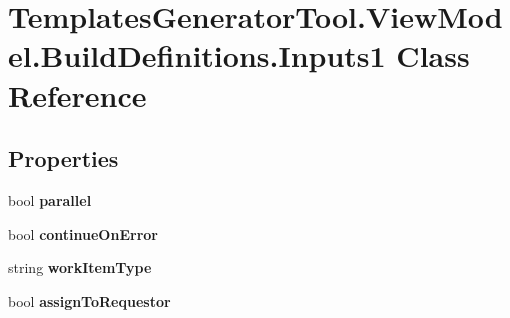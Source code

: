 \hypertarget{class_templates_generator_tool_1_1_view_model_1_1_build_definitions_1_1_inputs1}{}\section{Templates\+Generator\+Tool.\+View\+Model.\+Build\+Definitions.\+Inputs1 Class Reference}
\label{class_templates_generator_tool_1_1_view_model_1_1_build_definitions_1_1_inputs1}
\subsection*{Properties}
\begin{DoxyCompactItemize}
\item 
\mbox{\label{class_templates_generator_tool_1_1_view_model_1_1_build_definitions_1_1_inputs1_a7889a8105e52ce2127f5bbdc7e38c521}} 
bool {\bfseries parallel}
\item 
\mbox{\label{class_templates_generator_tool_1_1_view_model_1_1_build_definitions_1_1_inputs1_a112625b2b75f0912c9e38880867ef072}} 
bool {\bfseries continue\+On\+Error}
\item 
\mbox{\label{class_templates_generator_tool_1_1_view_model_1_1_build_definitions_1_1_inputs1_afe2dcf45837d9b8d3ca11f949ca28c81}} 
string {\bfseries work\+Item\+Type}
\item 
\mbox{\label{class_templates_generator_tool_1_1_view_model_1_1_build_definitions_1_1_inputs1_ae087b3d02f2ff342478081624b246f3e}} 
bool {\bfseries assign\+To\+Requestor}
\item 

\end{DoxyCompactItemize}
